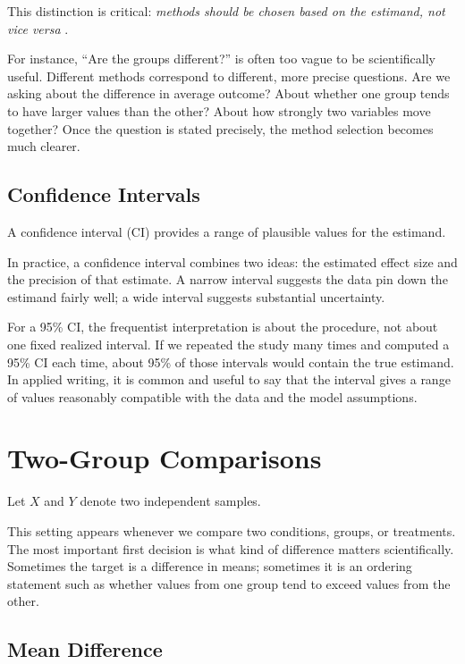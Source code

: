 \documentclass[11pt]{article}
\begin{document}
This distinction is critical: \emph{methods should be chosen based on the estimand, not vice versa} \citep{cumming2014newstatistics}.

For instance, ``Are the groups different?'' is often too vague to be scientifically useful. Different methods correspond to different, more precise questions. Are we asking about the difference in average outcome? About whether one group tends to have larger values than the other? About how strongly two variables move together? Once the question is stated precisely, the method selection becomes much clearer.

\subsection{Confidence Intervals}

A confidence interval (CI) provides a range of plausible values for the estimand.

In practice, a confidence interval combines two ideas: the estimated effect size and the precision of that estimate. A narrow interval suggests the data pin down the estimand fairly well; a wide interval suggests substantial uncertainty.

For a 95\% CI, the frequentist interpretation is about the procedure, not about one fixed realized interval. If we repeated the study many times and computed a 95\% CI each time, about 95\% of those intervals would contain the true estimand. In applied writing, it is common and useful to say that the interval gives a range of values reasonably compatible with the data and the model assumptions.

\section{Two-Group Comparisons}

Let $X$ and $Y$ denote two independent samples.

This setting appears whenever we compare two conditions, groups, or treatments. The most important first decision is what kind of difference matters scientifically. Sometimes the target is a difference in means; sometimes it is an ordering statement such as whether values from one group tend to exceed values from the other.

\subsection{Mean Difference}
\end{document}
